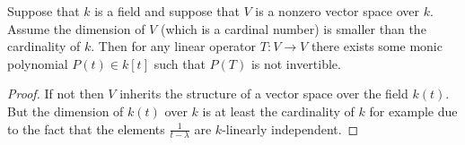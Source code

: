 \begin{lemma}
\label{lemma-dimension}
Suppose that $k$ is a field and suppose that $V$ is a nonzero vector
space over $k$. Assume the dimension of $V$ (which is a cardinal number)
is smaller than the cardinality of $k$. Then for any linear operator
$T : V \to V$ there exists some monic polynomial $P(t) \in k[t]$ such that
$P(T)$ is not invertible.
\end{lemma}

\begin{proof}
If not then $V$ inherits the structure of a vector space over
the field $k(t)$. But the dimension of $k(t)$ over $k$ is
at least the cardinality of $k$ for example due to the fact that the elements
$\frac{1}{t - \lambda}$ are $k$-linearly independent.
\end{proof}